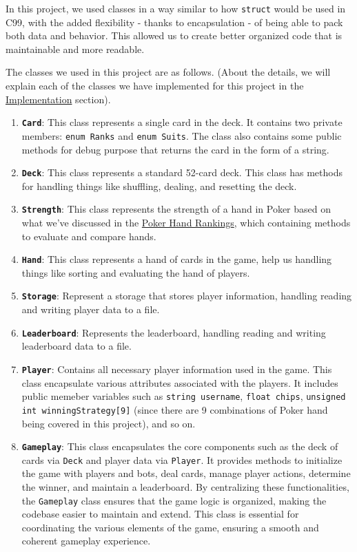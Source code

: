 \hspace{1cm} In this project, we used classes in a way similar to how \texttt{struct} would be used in C99, with the added flexibility - thanks to encapsulation - of being able to pack both data and behavior. This allowed us to create better organized code that is maintainable and more readable.

\vspace{0.5cm}

\hspace{1cm} The classes we used in this project are as follows. (About the details, we will explain each of the classes we have implemented for this project in the \hyperref[sec:implementation-of-the-poker-game]{Implementation} section).
\begin{enumerate}
    \item \textbf{\texttt{Card}}: This class represents a single card in the deck. It contains two private members: \texttt{enum Ranks} and \texttt{enum Suits}. The class also contains some public methods for debug purpose that returns the card in the form of a string.
    \item \textbf{\texttt{Deck}}: This class represents a standard 52-card deck. This class has methods for handling things like shuffling, dealing, and resetting the deck.
    \item \textbf{\texttt{Strength}}: This class represents the strength of a hand in Poker based on what we've discussed in the \hyperref[subsubsec:poker-hand-rankings]{Poker Hand Rankings}, which containing methods to evaluate and compare hands.
    \item \textbf{\texttt{Hand}}: This class represents a hand of cards in the game, help us handling things like sorting and evaluating the hand of players.
    \item \textbf{\texttt{Storage}}: Represent a storage that stores player information, handling reading and writing player data to a file.
    \item \textbf{\texttt{Leaderboard}}: Represents the leaderboard, handling reading and writing leaderboard data to a file.
    \item \textbf{\texttt{Player}}: Contains all necessary player information used in the game. This class encapsulate various attributes associated with the players. It includes public memeber variables such as \texttt{string username}, \texttt{float chips}, \texttt{unsigned int winningStrategy[9]} (since there are 9 combinations of Poker hand being covered in this project), and so on.
    \item \textbf{\texttt{Gameplay}}: This class encapsulates the core components such as the deck of cards via \texttt{Deck} and player data via \texttt{Player}. It provides methods to initialize the game with players and bots, deal cards, manage player actions, determine the winner, and maintain a leaderboard. By centralizing these functionalities, the \texttt{Gameplay} class ensures that the game logic is organized, making the codebase easier to maintain and extend. This class is essential for coordinating the various elements of the game, ensuring a smooth and coherent gameplay experience.

\end{enumerate}
